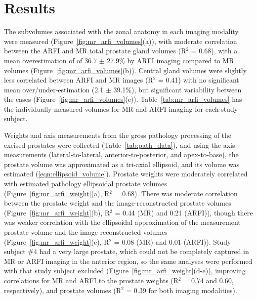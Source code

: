 \section{Results}\label{sect:results}
The subvolumes associated with the zonal anatomy in each imaging modality were
measured (Figure~\ref{fig:mr_arfi_volumes}(a)), with moderate correlation
between the ARFI and MR total prostate gland volumes (R$^2$ = 0.68), with a
mean overestimation of of 36.7 $\pm$ 27.9\% by ARFI imaging compared to MR
volumes (Figure~\ref{fig:mr_arfi_volumes}(b)).  Central gland volumes were
slightly less correlated between ARFI and MR images (R$^2$ = 0.41) with no
significant mean over/under-estimation (2.1 $\pm$ 39.1\%), but significant
variability between the cases (Figure~\ref{fig:mr_arfi_volumes}(c)).
Table~\ref{tab:mr_arfi_volumes} has the individually-measured volumes for MR
and ARFI imaging for each study subject.



Weights and axis measurements from the gross pathology processing of the
excised prostates were collected (Table~\ref{tab:path_data}), and using the
axis measurements (lateral-to-lateral, anterior-to-posterior, and
apex-to-base), the prostate volume was approximated as a tri-axial ellipsoid,
and its volume was estimated (\ref{eqn:ellipsoid_volume}).  Prostate weights
were moderately correlated with estimated pathology ellipsoidal prostate
volumes (Figure~\ref{fig:mr_arfi_weight}(a), R$^2$ = 0.68).  There was moderate
correlation between the prostate weight and the image-reconstructed prostate
volumes (Figure~\ref{fig:mr_arfi_weight}(b), R$^2$ = 0.44 (MR) and 0.21
(ARFI)), though there was weaker correlation with the ellipsoidal approximation
of the measurement prostate volume and the image-reconstructed volumes
(Figure~\ref{fig:mr_arfi_weight}(c), R$^2$ = 0.08 (MR) and 0.01 (ARFI)).  Study
subject \#4 had a very large prostate, which could not be completely captured
in MR or ARFI imaging in the anterior region, so the same analyses were
performed with that study subject excluded
(Figure~\ref{fig:mr_arfi_weight}(d-e)), improving correlations for MR and ARFI
to the prostate weights (R$^2$ = 0.74 and 0.60, respectively), and prostate
volumes (R$^2$ = 0.39 for both imaging modalities).



